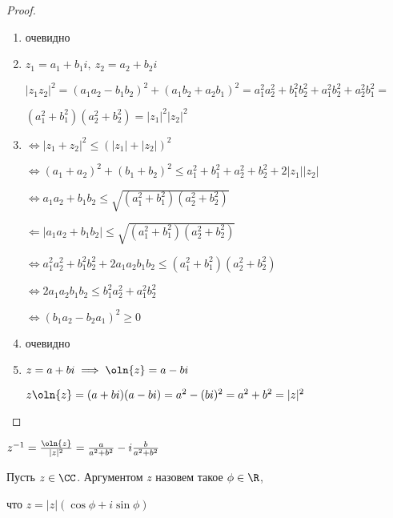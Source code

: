 \begin{proof}
    \begin{enumerate}
        \item очевидно
        
        \item $z_1 = a_1 + b_1i,~z_2 = a_2 + b_2i$
        
        $|z_1 z_2|^2 = (a_1 a_2 - b_1 b_2)^2 + (a_1 b_2 + a_2 b_1)^2 = a_1^2 a_2^2 + b_1^2 b_2^2 + a_1^2 b_2^2 + a_2^2 b_1^2 = $
        
        $(a_1^2 + b_1^2)(a_2^2 + b_2^2) = |z_1|^2|z_2|^2$
        
        \item $\iff |z_1 + z_2|^2 \leq (|z_1| + |z_2|)^2$
        
        $\iff (a_1 + a_2)^2 + (b_1 + b_2)^2 \leq a_1^2 + b_1^2 + a_2^2 + b_2^2 + 2|z_1||z_2|$
        
        $\iff a_1a_2 + b_1b_2 \leq \sqrt{(a_1^2 + b_1^2)(a_2^2 + b_2^2)}$
        
        $\Leftarrow |a_1 a_2 + b_1 b_2| \leq \sqrt{(a_1^2 + b_1^2)(a_2^2 + b_2^2)}$
        
        $\iff a_1^2 a_2^2 + b_1^2 b_2^2 + 2a_1a_2b_1b_2 \leq (a_1^2 + b_1^2)(a_2^2 + b_2^2)$
        
        $\iff 2a_1a_2b_1b_2 \leq b_1^2 a_2^2 + a_1^2 b_2^2$
        
        $\iff (b_1 a_2 - b_2 a_1)^2 \geq 0$

        \item очевидно
        
        \item $z = a + bi \implies \oln{z} = a - bi$
        
        $z \oln{z} = (a + bi)(a - bi) = a^2 - (bi)^2 = a^2 + b^2 = |z|^2$
    \end{enumerate}
\end{proof}

\begin{notice}
    $z^{-1} = \frac{\oln{z}}{|z|^2} = \frac{a}{a^2 + b^2} - i\frac{b}{a^2 + b^2}$
\end{notice}

\begin{defn}

    Пусть $z \in \CC$. Аргументом $z$ назовем такое $\phi \in \R$, 

    что $z = |z|(\cos\phi + i\sin\phi)$
\end{defn}

